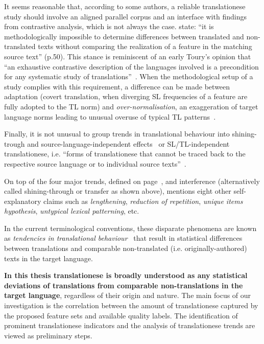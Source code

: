 It seems reasonable that, according to some authors, a reliable translationese study should involve an aligned parallel corpus and an interface with findings from contrastive analysis, which is not always the case. \citet{Evert2017} state: ``it is methodologically impossible to determine differences between translated and non-translated texts without comparing the realization of a feature in the matching source text'' (p.50). This stance is reminiscent of an early Toury's opinion that ``an exhaustive contrastive description of the languages involved is a precondition for any systematic study of translations''~\cite[p.29]{Toury1980}. When the methodological setup of a study complies with this requirement, a difference can be made between adaptation (covert translation, when diverging SL frequencies of a feature are fully adopted to the TL norm) and \textit{over-normalisation}, an exaggeration of target language norms leading to unusual overuse of typical TL patterns~\cite{Evert2017}. 

Finally, it is not unusual to group trends in translational behaviour into shining-trough and source-language-independent effects~\cite{Koppel2011} or SL/TL-independent translationese, i.e. ``forms of translationese that cannot be traced back to the respective source language or to individual source texts''~\cite[p.54]{Evert2017}.

On top of the four major trends, defined on page~\pageref{pg:major_trends}, and interference (alternatively called shining-through or transfer as shown above), \citet{Chesterman2004} mentions eight other self-explanatory claims such as \textit{lengthening}, \textit{reduction of repetition}, \textit{unique items hypothesis}, \textit{untypical lexical patterning}, etc.

In the current terminological conventions, these disparate phenomena are known as \textit{tendencies in translational behaviour}~\cite[see the use of the term in][]{Laviosa2008, Cappelle2017} that result in statistical differences between translations and comparable non-translated (i.e. originally-authored) texts in the target language.

\textbf{In this thesis translationese is broadly understood as any statistical deviations of translations from comparable non-translations in the target language}, regardless of their origin and nature. The main focus of our investigation is the correlation between the amount of translationese captured by the proposed feature sets and available quality labels. The identification of prominent translationese indicators and the analysis of translationese trends are viewed as preliminary steps. 

